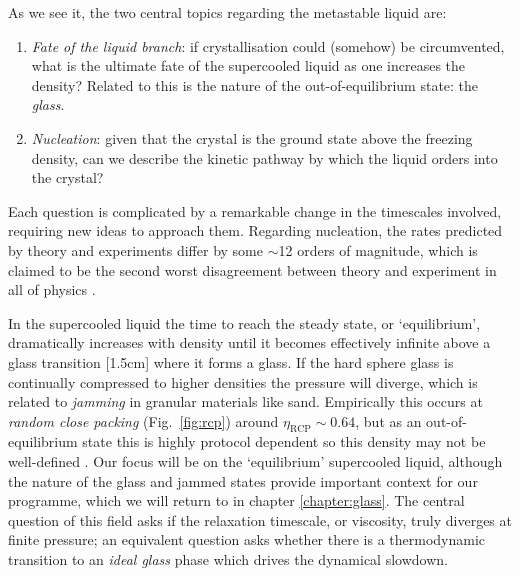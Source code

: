 \documentclass[11pt,twoside]{report}
\begin{document}
As we see it, the two central topics regarding the metastable liquid are:
\begin{enumerate}
\item \emph{Fate of the liquid branch}: if crystallisation could (somehow) be circumvented, what is the ultimate fate of the supercooled liquid as one increases the density?
  Related to this is the nature of the out-of-equilibrium state: the \emph{glass}.
\item \emph{Nucleation}: given that the crystal is the ground state above the freezing density, can we describe the kinetic pathway by which the liquid orders into the crystal?
\end{enumerate}
Each question is complicated by a remarkable change in the timescales involved, requiring new ideas to approach them.
Regarding nucleation, the rates predicted by theory and experiments differ by some $\sim$12 orders of magnitude, which is claimed to be the second worst disagreement%
between theory and experiment in all of physics \cite{RussoSM2013}.

In the supercooled liquid the time to reach the steady state, or `equilibrium', dramatically increases with density until it becomes effectively infinite above a glass transition%
[1.5cm]
where it forms a glass.
If the hard sphere glass is continually compressed to higher densities the pressure will diverge, which is related to \emph{jamming} in granular materials like sand.
Empirically this occurs at \emph{random close packing} (Fig.\ \ref{fig:rcp}) around $\eta_\mathrm{RCP} \sim 0.64$, but as an out-of-equilibrium state this is highly protocol dependent so this density may not be well-defined \cite{TorquatoRMP2010}.
Our focus will be on the `equilibrium' supercooled liquid, although the nature of the glass and jammed states provide important context for our programme, which we will return to in chapter \ref{chapter:glass}.
The central question of this field asks if the relaxation timescale, or viscosity, truly diverges at finite pressure; an equivalent question asks whether there is a thermodynamic transition to an \emph{ideal glass} phase which drives the dynamical slowdown.
\end{document}

